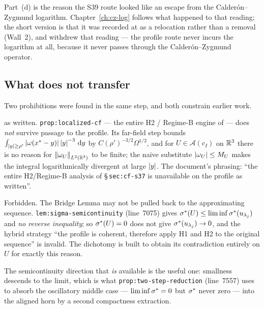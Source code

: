 Part~(d) is the reason the S39 route looked like an escape from the
Calder\'on--Zygmund logarithm. Chapter~\ref{ch:cz-log} follows what happened
to that reading; the short version is that it was recorded at  as a
relocation rather than a removal (Wall~2), and  withdrew that reading
--- the profile route never incurs the logarithm at all, because it never
passes through the Calder\'on--Zygmund operator.

\subsection{What does not transfer}

Two prohibitions were found in the same step, and both constrain earlier work.

\begin{statement}
\label{st:nontransfer-i}
\IMPOSSIBLE{} as written. \texttt{prop:localized-cf} --- the entire H2 /
Regime-B engine of  --- does \emph{not} survive passage to the profile.
Its far-field step bounds
\(\int_{\left|y\right|\ge\rho'}\left|\omega(x^*-y)\right|\left|y\right|^{-3}\,\mathrm{d} y\) by
\(C(\rho')^{-3/2}\Omega^{1/2}\), and for \(U\in\mathcal{A}(c_I)\) on \(\mathbb{R}^3\)
there is no reason for \(\left\|\omega_U\right\|_{L^2(\mathbb{R}^3)}\) to be finite; the naive
substitute \(\left|\omega_U\right|\le M_U\) makes the integral logarithmically
divergent at large \(\left|y\right|\). The document's phrasing: ``the entire
H2/Regime-B analysis of \S\,\texttt{sec:cf-s37} is unavailable on the profile as
written''.
\end{statement}

\begin{statement}
\label{st:nontransfer-ii}
Forbidden. The Bridge Lemma may not be pulled back to the approximating
sequence. \texttt{lem:sigma-semicontinuity} (line~7075) gives
\(\sigma^{*}(U)\le\liminf\sigma^{*}(u_{\lambda_j})\) and \emph{no reverse inequality};
so \(\sigma^{*}(U)=0\) does not give \(\sigma^{*}(u_{\lambda_j})\to0\), and the hybrid
strategy ``the profile is coherent, therefore apply H1 and H2 to the original
sequence'' is invalid. The  dichotomy is built to obtain its
contradiction entirely on \(U\) for exactly this reason.
\end{statement}

The semicontinuity direction that \emph{is} available is the useful one:
smallness descends to the limit, which is what
\texttt{prop:two-step-reduction} (line~7557) uses to absorb the oscillatory
middle case --- \(\liminf\sigma^{*}=0\) but \(\sigma^{*}\) never zero --- into the
aligned horn by a second compactness extraction.

